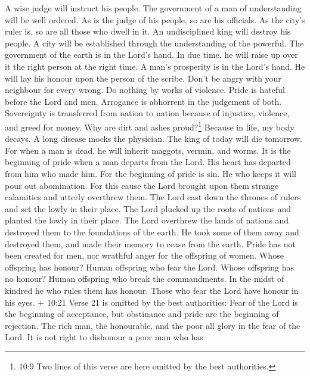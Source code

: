  A wise judge will instruct his people. The government of a
man of understanding will be well ordered.  As is the judge
of his people, so are his officials. As the city's ruler is, so are all
those who dwell in it.  An undisciplined king will destroy
his people. A city will be established through the understanding of the
powerful.  The government of the earth is in the Lord's
hand. In due time, he will raise up over it the right person at the
right time.  A man's prosperity is in the Lord's hand. He
will lay his honour upon the person of the scribe.  Don't be
angry with your neighbour for every wrong. Do nothing by works of
violence.  Pride is hateful before the Lord and men.
Arrogance is abhorrent in the judgement of both. 
Sovereignty is transferred from nation to nation because of injustice,
violence, and greed for money.  Why are dirt and ashes
proud?\footnote{10:9 Two lines of this verse are here omitted by the
  best authorities.} Because in life, my body decays.  A
long disease mocks the physician. The king of today will die tomorrow.
 For when a man is dead, he will inherit maggots, vermin,
and worms.  It is the beginning of pride when a man departs
from the Lord. His heart has departed from him who made him.
 For the beginning of pride is sin. He who keeps it will
pour out abomination. For this cause the Lord brought upon them strange
calamities and utterly overthrew them.  The Lord cast down
the thrones of rulers and set the lowly in their place. 
The Lord plucked up the roots of nations and planted the lowly in their
place.  The Lord overthrew the lands of nations and
destroyed them to the foundations of the earth.  He took
some of them away and destroyed them, and made their memory to cease
from the earth.  Pride has not been created for men, nor
wrathful anger for the offspring of women.  Whose offspring
has honour? Human offspring who fear the Lord. Whose offspring has no
honour? Human offspring who break the commandments.  In the
midst of kindred he who rules them has honour. Those who fear the Lord
have honour in his eyes.  + 10:21 Verse 21 is omitted by
the best authorities: Fear of the Lord is the beginning of acceptance,
but obstinance and pride are the beginning of rejection. 
The rich man, the honourable, and the poor all glory in the fear of the
Lord.  It is not right to dishonour a poor man who has
